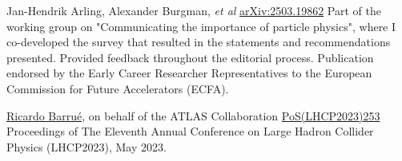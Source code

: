 
\begin{cventries}
    {Jan-Hendrik Arling, Alexander Burgman, \textit{et al}}{}
    {\href{https://arxiv.org/pdf/2503.19862}{arXiv:2503.19862}}
    {
        Part of the working group on "Communicating the importance of particle physics", where I co-developed the survey that resulted in the statements and recommendations presented. Provided feedback throughout the editorial process. Publication endorsed by the Early Career Researcher Representatives to the European Commission for Future Accelerators (ECFA).
    }    
\end{cventries}




\begin{cventries}
    {\underline{Ricardo Barrué}, on behalf of the ATLAS Collaboration}{}
    {\href{https://pos.sissa.it/450/253/}{PoS(LHCP2023)253}}
    {
        Proceedings of The Eleventh Annual Conference on Large Hadron Collider Physics (LHCP2023), May 2023.
    }
\end{cventries}


